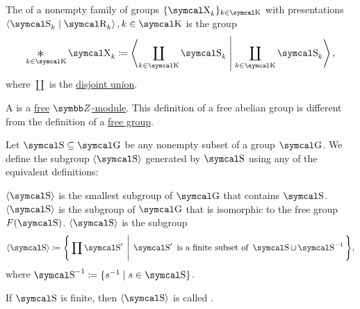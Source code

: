 \begin{definition}\label{def:group_free_product}
  The  of a nonempty family of groups \( \{ \CX_k \}_{k \in \CK} \) with presentations \( \Gen{\CS_k \mid \CR_k}, k \in \CK \) is the group
  \begin{equation*}
    \Ast_{k \in \CK} \CX_k \coloneqq \Gen{ \coprod_{k \in \CK} \CS_k \;\middle\vert\; \coprod_{k \in \CK} \CS_k },
  \end{equation*}
  where \( \coprod \) is the \hyperref[def:disjoint_union]{disjoint union}.
\end{definition}

\begin{definition}\label{def:free_abelian_group}
  A  is a \hyperref[def:free_left_module]{free} \hyperref[thm:abelian_group_iff_z_module]{\( \BZ \)-module}. This definition of a free abelian group is different from the definition of a \hyperref[def:free_group]{free group}.
\end{definition}

\begin{definition}\label{def:generated_subgroup}
  Let \( \CS \subseteq \CG \) be any nonempty subset of a group \( \CG \). We define the subgroup \( \Gen{\CS} \) generated by \( \CS \) using any of the equivalent definitions:
  \begin{DefEnum}
     \( \Gen{\CS} \) is the smallest subgroup of \( \CG \) that contains \( \CS \).
     \( \Gen{\CS} \) is the subgroup of \( \CG \) that is isomorphic to the free group \( F(\CS) \).
     \( \Gen{\CS} \) is the subgroup
    \begin{equation*}
      \Gen{\CS} \coloneqq \Bigg\{ \prod \CS' \;\Bigg\vert\; \CS' \text{ is a finite subset of } \CS \cup \CS^{-1} \Bigg\},
    \end{equation*}
    where \( \CS^{-1} \coloneqq \{ s^{-1} \mid s \in \CS \} \).
  \end{DefEnum}

  If \( \CS \) is finite, then \( \Gen \CS \) is called .
\end{definition}
